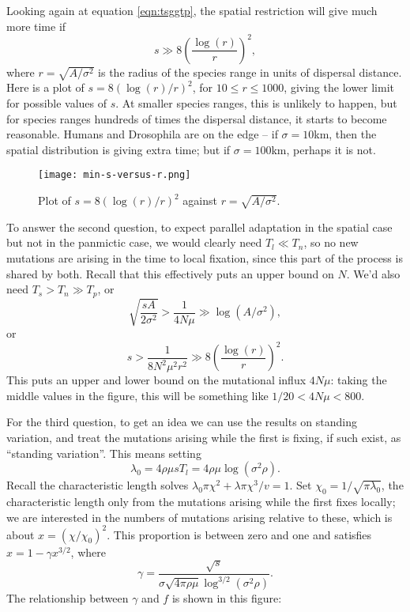 \documentclass{article}
\begin{document}
Looking again at equation \eqref{eqn:tsggtp},
the spatial restriction will give much more time if
\[
  s \gg 8 \left( \frac{\log(r)}{r} \right)^2,
\]
where $r=\sqrt{A/\sigma^2}$ is the radius of the species range in units of dispersal distance.
Here is a plot of $s = 8 \left( \log(r)/r \right)^2$,
for $10 \le r \le 1000$, giving the lower limit for possible values of $s$.
At smaller species ranges, this is unlikely to happen, 
but for species ranges hundreds of times the dispersal distance, it starts to become reasonable.
Humans and Drosophila are on the edge -- if $\sigma=10$km,
then the spatial distribution is giving extra time; 
but if $\sigma=100$km, perhaps it is not.

 \begin{figure}[hht]
  \texttt{[image: min-s-versus-r.png]}
 \caption{Plot of $s= 8 \left( \log(r)/r \right)^2$ against $r=\sqrt{A/\sigma^2}$.} 
 \end{figure}

To answer the second question, 
to expect parallel adaptation in the spatial case but not in the panmictic case,
we would clearly need $T_l \ll T_n$, so no new mutations are arising in the time to local fixation,
since this part of the process is shared by both.
Recall that this effectively puts an upper bound on $N$.
We'd also need
$T_s > T_n \gg T_p$,
or
\begin{equation}
  \sqrt{\frac{sA}{2\sigma^2}} > \frac{1}{4N\mu} \gg \log(A/\sigma^2) ,
\end{equation}
or
\begin{equation}
  s > \frac{1}{8 N^2 \mu^2 r^2} \gg 8 \left(\frac{ \log(r) }{ r }\right)^2 .
\end{equation}
This puts an upper and lower bound on the mutational influx $4N\mu$:
taking the middle values in the figure, 
this will be something like $1/20 < 4N\mu < 800$.

For the third question,
to get an idea we can use the results on standing variation,
and treat the mutations arising while the first is fixing, if such exist, as ``standing variation''.
This means setting 
\[
  \lambda_0 = 4 \rho \mu s T_l = 4 \rho \mu \log(\sigma^2 \rho) .
\]
Recall the characteristic length solves $\lambda_0 \pi \chi^2 + \lambda \pi \chi^3/v = 1$.
Set $\chi_0 = 1/\sqrt{\pi \lambda_0}$, 
the characteristic length only from the mutations arising while the first fixes locally;
we are interested in the numbers of mutations arising relative to these,
which is about $x=(\chi/\chi_0)^2$.
This proportion is between zero and one and satisfies
$x = 1-\gamma x^{3/2}$, 
where 
\[
  \gamma = \frac{ \sqrt{s} }{ \sigma \sqrt{4 \pi \rho \mu} \log^{3/2}(\sigma^2 \rho) } .
\]
The relationship between $\gamma$ and $f$ is shown in this figure:
\end{document}
